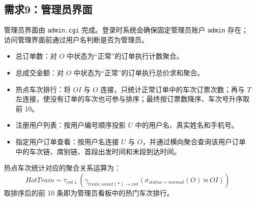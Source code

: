 \documentclass[10pt,a4paper]{article}
\begin{document}
\subsection{需求9：管理员界面}

管理员界面由 \texttt{admin.cgi} 完成。登录时系统会确保固定管理员账户 \texttt{admin} 存在；访问管理界面前通过用户名判断是否为管理员。

\begin{itemize}
    \item 总订单数：对 $O$ 中状态为“正常”的订单执行计数聚合。
    \item 总成交金额：对 $O$ 中状态为“正常”的订单执行总价求和聚合。
    \item 热点车次排行：将 $OI$ 与 $O$ 连接，只统计正常订单中的车次订票次数；再与 $T$ 左连接，使没有订单的车次也可参与排序；最终按订票数降序、车次号升序取前 10。
    \item 注册用户列表：按用户编号顺序投影 $U$ 中的用户名、真实姓名和手机号。
    \item 指定用户订单查看：按用户名连接 $U$ 与 $O$，并通过横向聚合查询该用户订单中的车次链、席别链、首段出发时间和末段到达时间。
\end{itemize}

热点车次统计对应的聚合关系运算为：
\[
HotTrain=\tau_{cnt\downarrow}(\gamma_{train;count(*)\rightarrow cnt}(\sigma_{status=normal}(O) \bowtie OI))
\]
取排序后的前 10 条即为管理员看板中的热门车次排行。
\end{document}

